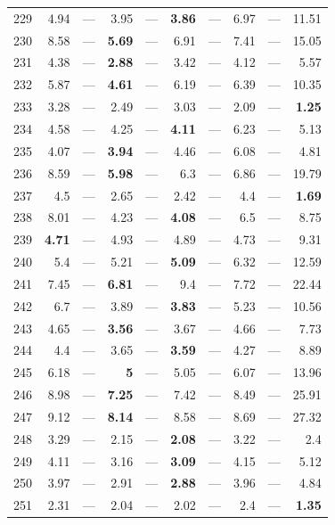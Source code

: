 \begin{longtable}{lr@{\hskip 4pt}l@{\hskip 12pt}r@{\hskip 4pt}l@{\hskip 12pt}r@{\hskip 4pt}l@{\hskip 12pt}r@{\hskip 4pt}l@{\hskip 12pt}r}
229 & 4.94 & --- & 3.95 & --- & \textbf{3.86} & --- & 6.97 & --- & 11.51 \\
230 & 8.58 & --- & \textbf{5.69} & --- & 6.91 & --- & 7.41 & --- & 15.05 \\
231 & 4.38 & --- & \textbf{2.88} & --- & 3.42 & --- & 4.12 & --- & 5.57 \\
232 & 5.87 & --- & \textbf{4.61} & --- & 6.19 & --- & 6.39 & --- & 10.35 \\
233 & 3.28 & --- & 2.49 & --- & 3.03 & --- & 2.09 & --- & \textbf{1.25} \\
234 & 4.58 & --- & 4.25 & --- & \textbf{4.11} & --- & 6.23 & --- & 5.13 \\
235 & 4.07 & --- & \textbf{3.94} & --- & 4.46 & --- & 6.08 & --- & 4.81 \\
236 & 8.59 & --- & \textbf{5.98} & --- & 6.3 & --- & 6.86 & --- & 19.79 \\
237 & 4.5 & --- & 2.65 & --- & 2.42 & --- & 4.4 & --- & \textbf{1.69} \\
238 & 8.01 & --- & 4.23 & --- & \textbf{4.08} & --- & 6.5 & --- & 8.75 \\
239 & \textbf{4.71} & --- & 4.93 & --- & 4.89 & --- & 4.73 & --- & 9.31 \\
240 & 5.4 & --- & 5.21 & --- & \textbf{5.09} & --- & 6.32 & --- & 12.59 \\
241 & 7.45 & --- & \textbf{6.81} & --- & 9.4 & --- & 7.72 & --- & 22.44 \\
242 & 6.7 & --- & 3.89 & --- & \textbf{3.83} & --- & 5.23 & --- & 10.56 \\
243 & 4.65 & --- & \textbf{3.56} & --- & 3.67 & --- & 4.66 & --- & 7.73 \\
244 & 4.4 & --- & 3.65 & --- & \textbf{3.59} & --- & 4.27 & --- & 8.89 \\
245 & 6.18 & --- & \textbf{5} & --- & 5.05 & --- & 6.07 & --- & 13.96 \\
246 & 8.98 & --- & \textbf{7.25} & --- & 7.42 & --- & 8.49 & --- & 25.91 \\
247 & 9.12 & --- & \textbf{8.14} & --- & 8.58 & --- & 8.69 & --- & 27.32 \\
248 & 3.29 & --- & 2.15 & --- & \textbf{2.08} & --- & 3.22 & --- & 2.4 \\
249 & 4.11 & --- & 3.16 & --- & \textbf{3.09} & --- & 4.15 & --- & 5.12 \\
250 & 3.97 & --- & 2.91 & --- & \textbf{2.88} & --- & 3.96 & --- & 4.84 \\
251 & 2.31 & --- & 2.04 & --- & 2.02 & --- & 2.4 & --- & \textbf{1.35} \\

\end{longtable}
